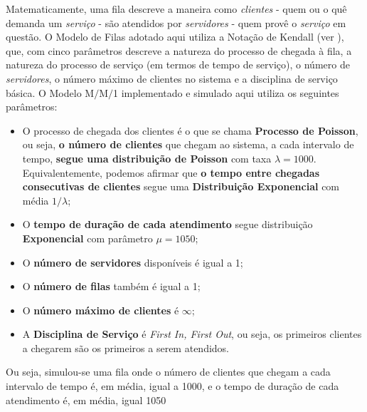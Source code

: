 \documentclass[a4paper,12pt,english,brazil]{article}
\begin{document}
Matematicamente, uma fila descreve a maneira como \textit{clientes} - quem ou o quê demanda um \textit{serviço} - são atendidos por \textit{servidores} - quem provê o \textit{serviço} em questão. O Modelo de Filas adotado aqui utiliza a Notação de Kendall (ver \citet{bose2013introduction}), que, com cinco parâmetros descreve a natureza do processo de chegada à fila, a natureza do processo de serviço (em termos de tempo de serviço), o número de \textit{servidores}, o número máximo de clientes no sistema e a disciplina de serviço básica. O Modelo M$/$M$/$1 implementado e simulado aqui utiliza os seguintes parâmetros:

\begin{itemize}
\item O processo de chegada dos clientes é o que se chama \textbf{Processo de Poisson}, ou seja,\textbf{ o número de clientes} que chegam ao sistema, a cada intervalo de tempo, \textbf{segue uma distribuição de Poisson} com taxa $\lambda = 1000$. Equivalentemente, podemos afirmar que \textbf{o tempo entre chegadas consecutivas de clientes} segue uma \textbf{Distribuição Exponencial} com média $1/\lambda$;
\item O \textbf{tempo de duração de cada atendimento} segue distribuição \textbf{Exponencial} com parâmetro $\mu = 1050$;
\item O \textbf{número de servidores} disponíveis é igual a 1;
\item O \textbf{número de filas} também é igual a 1;
\item O \textbf{número máximo de clientes} é $\infty$;
\item A \textbf{Disciplina de Serviço} é \textit{First In, First Out}, ou seja, os primeiros clientes a chegarem são os primeiros a serem atendidos.
\end{itemize}

Ou seja, simulou-se uma fila onde o número de clientes que chegam a cada intervalo de tempo é, em média, igual a 1000, e o tempo de duração de cada atendimento é, em média, igual 1050


\end{document}
